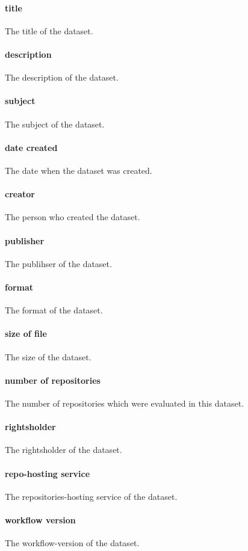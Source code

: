 \paragraph{title}
The title of the dataset.
\paragraph{description}
The description of the dataset.
\paragraph{subject}
The subject of the dataset.
\paragraph{date created}
The date when the dataset was created.
\paragraph{creator}
The person who created the dataset.
\paragraph{publisher}
The publihser of the dataset.
\paragraph{format}
The format of the dataset.
\paragraph{size of file}
The size of the dataset.
\paragraph{number of repositories}
The number of repositories which were evaluated in this dataset.
\paragraph{rightsholder}
The rightsholder of the dataset.
\paragraph{repo-hosting service}
The repositories-hosting service of the dataset.
\paragraph{workflow version}
The workflow-version of the dataset.

